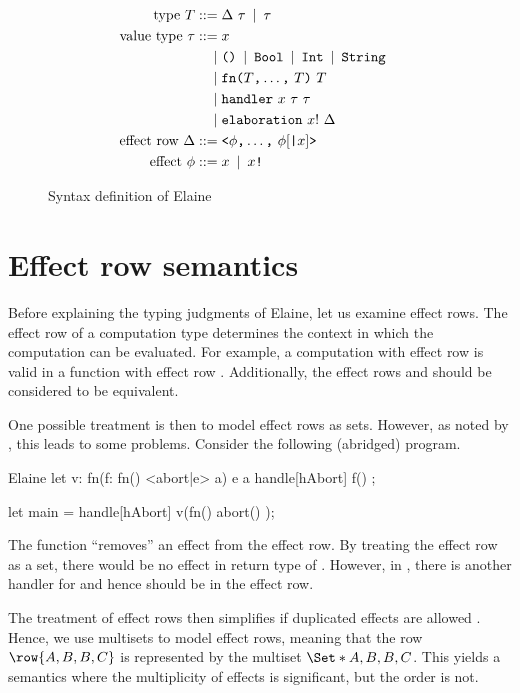\begin{figure}[p]
\begin{align*}
    \\
    \text{type}\ T
        \mathbin{\;::=\;} & \Delta\ \tau \mathbin{\;|\;} \tau\\
    \text{value type}\ \tau
        \mathbin{\;::=\;} & x \\ 
        \mathbin{\;|\;} & \text{\texttt{()}} \mathbin{\;|\;} \text{\texttt{Bool}} \mathbin{\;|\;} \text{\texttt{Int}} \mathbin{\;|\;} \text{\texttt{String}}\\
        \mathbin{\;|\;} & \text{\texttt{fn}} \text{\texttt{(}} T\text{\texttt{,}} \dots \text{\texttt{,}}\ T \text{\texttt{)}}\ T \\
        \mathbin{\;|\;} & \text{\texttt{handler}}\ x\ \tau\ \tau \\
        \mathbin{\;|\;} & \text{\texttt{elaboration}}\ x!\ \Delta \\
    \text{effect row}\ \Delta
        \mathbin{\;::=\;} & \text{\texttt{<}} \phi\text{\texttt{,}} \dots \text{\texttt{,}}\ \phi [\text{\texttt{|}} x] \text{\texttt{>}} \\
    \text{effect}\ \phi \mathbin{\;::=\;} & x \mathbin{\;|\;} x\text{\texttt{!}}
\end{align*}
\caption{Syntax definition of Elaine}
\label{fig:syntax}
\end{figure}

\section{Effect row semantics}\label{sec:effectrows}

Before explaining the typing judgments of Elaine, let us examine effect rows. The effect row of a computation type determines the context in which the computation can be evaluated. For example, a computation with effect row  is valid in a function with effect row . Additionally, the effect rows  and  should be considered to be equivalent.

One possible treatment is then to model effect rows as sets. However, as noted by \textcite{leijen_koka_2014}, this leads to some problems. Consider the following (abridged) program.
\begin{lst}{Elaine}
let v: fn(f: fn() <abort|e> a) e a {
    handle[hAbort] f()
};

let main = handle[hAbort] v(fn() { abort() });
\end{lst}
The function  ``removes'' an  effect from the effect row. By treating the effect row as a set, there would be no  effect in return type of . However, in , there is another handler for  and hence  should be in the effect row.

The treatment of effect rows then simplifies if duplicated effects are allowed \autocite{leijen_koka_2014}. Hence, we use multisets to model effect rows, meaning that the row $\row{A, B, B, C}$ is represented by the multiset $\S{A, B, B, C}$. This yields a semantics where the multiplicity of effects is significant, but the order is not.


